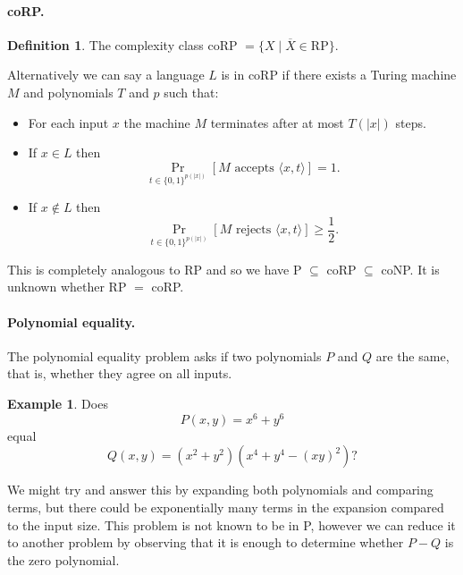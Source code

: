 \documentclass[11pt,a4paper]{article}
\theoremstyle{definition}
\newtheorem{defn}{Definition}
\newtheorem*{ex}{Example}
\begin{document}
\paragraph{coRP.}
\begin{defn}
The complexity class coRP $ = \{X \mid \overline{X} \in \text{RP}\}$.

Alternatively we can say a language $L$ is in coRP if there exists a Turing machine $M$ and polynomials $T$ and $p$ such that:
\begin{itemize}
\item
For each input $x$ the machine $M$ terminates after at most $T(|x|)$ steps.
\item
If $x\in L$ then \[\Pr_{t\in \{0,1\}^{p(|x|)}}[M \text{ accepts } \langle x, t\rangle] = 1.\]
\item
If $x\not\in L$ then \[\Pr_{t\in \{0,1\}^{p(|x|)}}[M \text{ rejects } \langle x, t\rangle] \ge \frac{1}{2}.\]
\end{itemize}
\end{defn}
This is completely analogous to RP and so we have P $\subseteq$ coRP $\subseteq$ coNP.
It is unknown whether RP $=$ coRP.

\paragraph{Polynomial equality.}
The polynomial equality problem asks if two polynomials $P$ and $Q$ are the same, that is, whether they agree on all inputs.
\begin{ex}
Does
\[
P(x,y) = x^6 + y^6
\]
equal
\[
Q(x,y) = (x^2 + y^2)(x^4 + y^4 - (xy)^2)?
\]
\end{ex}

We might try and answer this by expanding both polynomials and comparing terms, but there could be exponentially many terms in the expansion compared to the input size.
This problem is not known to be in P, however we can reduce it to another problem by observing that it is enough to determine whether $P - Q$ is the zero polynomial.
\end{document}
